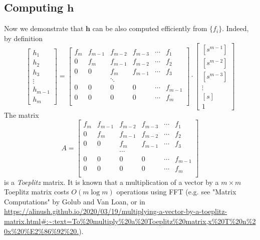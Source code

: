 \documentclass[a4paper]{article}
\begin{document}
\subsection{Computing $\mathbf{h}$}\label{sec:h}

Now we demonstrate that $\mathbf{h}$ can be also computed efficiently from $\{f_i\}$. Indeed, by definition
$$
\begin{bmatrix}
h_1\\
h_2\\
h_3\\
\vdots\\
h_{m-1}\\
h_m
\end{bmatrix}= \begin{bmatrix}
f_m &f_{m-1}&f_{m-2}&f_{m-3}&\cdots & f_1\\
0& f_m &f_{m-1}&f_{m-2}&\cdots & f_2\\
0 & 0& f_m &f_{m-1}&\cdots & f_3\\
&&\ddots&&&\\
0 & 0& 0 &0&\cdots & f_{m-1}\\
0 & 0& 0 &0&\cdots & f_m\\
\end{bmatrix}\cdot\begin{bmatrix}
[s^{m-1}]\\
[s^{m-2}]\\
[s^{m-3}]\\
\vdots\\
[s]\\
1
\end{bmatrix}
$$
The matrix 
$$
A = \begin{bmatrix}
f_m &f_{m-1}&f_{m-2}&f_{m-3}&\cdots & f_1\\
0& f_m &f_{m-1}&f_{m-2}&\cdots & f_2\\
0 & 0& f_m &f_{m-1}&\cdots & f_3\\
&&\cdots&&&\\
0 & 0& 0 &0&\cdots & f_{m-1}\\
0 & 0& 0 &0&\cdots & f_m\\
\end{bmatrix}
$$
is a \emph{Toeplitz} matrix. It is known that a multiplication of a vector by a $m\times m$ Toeplitz matrix costs $O(m\log m)$ operations using FFT (e.g. see "Matrix Computations" by Golub and Van Loan, or in \url{https://alinush.github.io/2020/03/19/multiplying-a-vector-by-a-toeplitz-matrix.html#:~:text=To%20multiply%20a%20Toeplitz%20matrix,x%20T%20n%20x%20%E2%86%92%20.}). 
\end{document}
